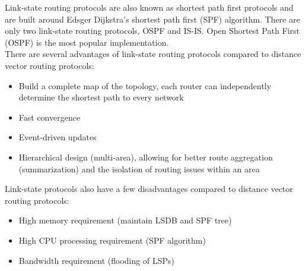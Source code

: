 Link-state routing protocols are also known as shortest path first protocols and are built around Edsger Dijkstra's shortest path first (SPF) algorithm. There are only two link-state routing protocols, OSPF and IS-IS. Open Shortest Path First (OSPF) is the most popular implementation.\\

There are several advantages of link-state routing protocols compared to distance vector routing protocols: 

\begin{itemize}
\item Build a complete map of the topology, each router can independently determine the shortest path to every network
\item Fast convergence
\item Event-driven updates
\item Hierarchical design (multi-area), allowing for better route aggregation (summarization) and the isolation of routing issues within an area
\end{itemize}

Link-state protocols also have a few disadvantages compared to distance vector routing protocols:

\begin{itemize}
\item High memory requirement (maintain LSDB and SPF tree)
\item High CPU processing requirement (SPF algorithm)
\item Bandwidth requirement (flooding of LSPs)
\end{itemize}